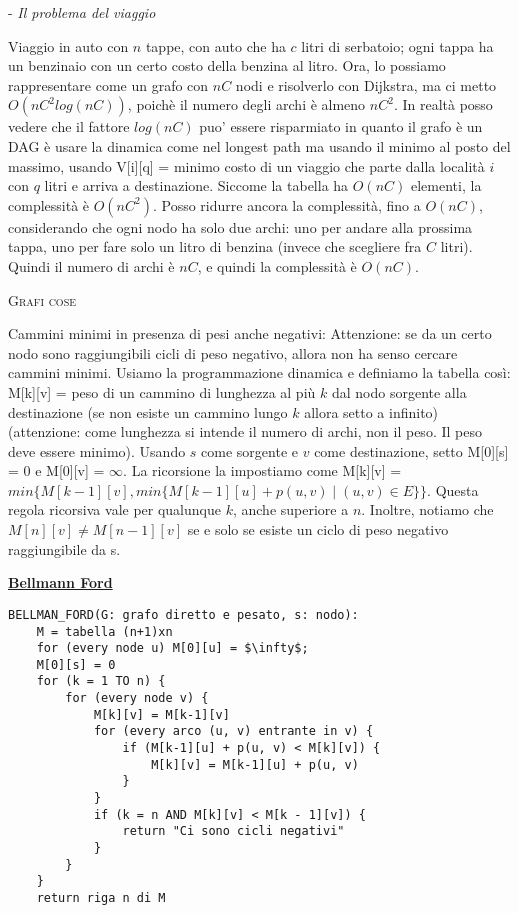 \documentclass[a4paper,10pt]{article} %
\newcommand{\malgorithm}[1]{%
    {\bigbreak \par \hspace*{4pt} \underline{\textbf {#1}}}}
\newcommand{\msection}[1]{%
    {\newpage\bigbreak \bigbreak \par \hfil \huge \textsc {#1}}\par}
\begin{document}
- \emph {Il problema del viaggio} \par
Viaggio in auto con $n$ tappe, con auto che ha $c$ litri di serbatoio; ogni tappa ha un benzinaio con un certo costo della benzina al litro.  Ora, lo possiamo rappresentare come un grafo con $nC$ nodi e risolverlo con Dijkstra, ma ci metto $O(nC^2log(nC))$, poichè il numero degli archi è almeno $nC^2$.  In realtà posso vedere che il fattore $log(nC)$ puo' essere risparmiato in quanto il grafo è un DAG è usare la dinamica come nel longest path ma usando il minimo al posto del massimo, usando V[i][q] = minimo costo di un viaggio che parte dalla località $i$ con $q$ litri e arriva a destinazione. Siccome la tabella ha $O(nC)$ elementi, la complessità è $O(nC^2)$. Posso ridurre ancora la complessità, fino a $O(nC)$, considerando che ogni nodo ha solo due archi: uno per andare alla prossima tappa, uno per fare solo un litro di benzina (invece che scegliere fra $C$ litri). Quindi il numero di archi è $nC$, e quindi la complessità è $O(nC)$.
\medskip

\msection{Grafi cose}

Cammini minimi in presenza di pesi anche negativi:
Attenzione: se da un certo nodo sono raggiungibili cicli di peso negativo, allora non ha senso cercare cammini minimi. Usiamo la programmazione dinamica e definiamo la tabella così: M[k][v] = peso di un cammino di lunghezza al più $k$ dal nodo sorgente alla destinazione (se non esiste un cammino lungo $k$ allora setto a infinito) (attenzione: come lunghezza si intende il numero di archi, non il peso. Il peso deve essere minimo). Usando $s$ come sorgente e $v$ come destinazione, setto M[0][s] = 0 e M[0][v] = $\infty$. La ricorsione la impostiamo come M[k][v] = $min\{M[k - 1][v], min\{M[k-1][u] + p(u,v) \mid (u,v) \in E\}\}$. Questa regola ricorsiva vale per qualunque $k$, anche superiore a $n$. Inoltre, notiamo che $M[n][v] \neq M[n - 1][v]$ se e solo se esiste un ciclo di peso negativo raggiungibile da s.

\malgorithm{Bellmann Ford}
\begin{lstlisting}
BELLMAN_FORD(G: grafo diretto e pesato, s: nodo):
    M = tabella (n+1)xn
    for (every node u) M[0][u] = $\infty$;
    M[0][s] = 0
    for (k = 1 TO n) {
        for (every node v) {
            M[k][v] = M[k-1][v]
            for (every arco (u, v) entrante in v) {
                if (M[k-1][u] + p(u, v) < M[k][v]) {
                    M[k][v] = M[k-1][u] + p(u, v)
                }
            }
            if (k = n AND M[k][v] < M[k - 1][v]) {
                return "Ci sono cicli negativi"
            }
        }
    }
    return riga n di M
\end{lstlisting}
\end{document}
